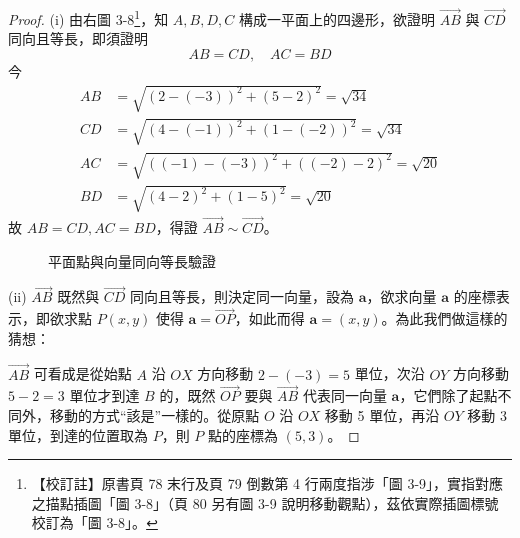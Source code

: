 \begin{proof}
(i) \label{note:b3-ch3-p78-fig3-9}%
由右圖 3-8\footnote{【校訂註】原書頁 78 末行及頁 79 倒數第 4 行兩度指涉「圖 3-9」，實指對應之描點插圖「圖 3-8」（頁 80 另有圖 3-9 說明移動觀點），茲依實際插圖標號校訂為「圖 3-8」。}，知 $A, B, D, C$ 構成一平面上的四邊形，欲證明 $\vec{AB}$ 與 $\vec{CD}$ 同向且等長，即須證明
\[ AB = CD, \quad AC = BD \]
今
\begin{align*}
AB &= \sqrt{(2 - (-3))^2 + (5 - 2)^2} = \sqrt{34} \\
CD &= \sqrt{(4 - (-1))^2 + (1 - (-2))^2} = \sqrt{34} \\
AC &= \sqrt{((-1) - (-3))^2 + ((-2) - 2)^2} = \sqrt{20} \\
BD &= \sqrt{(4 - 2)^2 + (1 - 5)^2} = \sqrt{20}
\end{align*}
故 $AB = CD, AC = BD$，得證 $\vec{AB} \sim \vec{CD}$。

\begin{figure}[H]
\centering
{}
\caption{平面點與向量同向等長驗證}
\label{fig:b3-fig3-8}
\end{figure}

(ii) $\vec{AB}$ 既然與 $\vec{CD}$ 同向且等長，則決定同一向量，設為 $\mathbf{a}$，欲求向量 $\mathbf{a}$ 的座標表示，即欲求點 $P(x, y)$ 使得 $\mathbf{a} = \vec{OP}$，如此而得 $\mathbf{a} = (x, y)$。為此我們做這樣的猜想：

$\vec{AB}$ 可看成是從始點 $A$ 沿 $OX$ 方向移動 $2 - (-3) = 5$ 單位，次沿 $OY$ 方向移動 $5 - 2 = 3$ 單位才到達 $B$ 的，既然 $\vec{OP}$ 要與 $\vec{AB}$ 代表同一向量 $\mathbf{a}$，它們除了起點不同外，移動的方式``該是''一樣的。從原點 $O$ 沿 $OX$ 移動 5 單位，再沿 $OY$ 移動 3 單位，到達的位置取為 $P$，則 $P$ 點的座標為 $(5, 3)$。


\end{proof}
